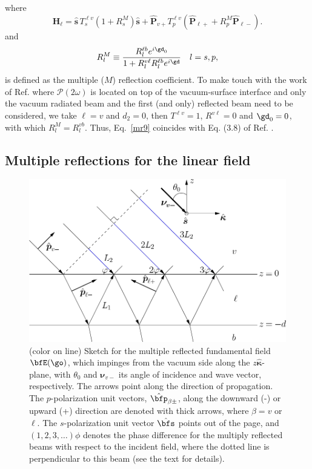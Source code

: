 where
\begin{equation}\label{mr9}
\mathbf{H}_{\ell}
= \hat{\mathbf{s}}\,T_s^{\ell v}
\left(1+
R^M_s
\right)
\hat{\mathbf{s}}
+ \hat{\mathbf{P}}_{v+}T_{p}^{\ell v}
\left(
\hat{\mathbf{P}}_{\ell +} +
R^M_p
 \hat{\mathbf{P}}_{\ell -}
\right). 
\end{equation}
and
\begin{align}\label{m61}
R^M_l\equiv\frac{R^{\ell b}_le^{i\gd_0}}{1+R^{v\ell}_l R^{\ell b}_l e^{i\gd}}
\quad l=s,p
,
\end{align}
is defined as the multiple  ($M$) reflection coefficient.
To make touch with the work of Ref. \cite{mizrahiJOSA88} where
$\boldsymbol{\mathcal{P}}(2\omega)$ is located on top of the
vacuum-surface interface and only the vacuum radiated beam and the
first (and only) reflected beam need to be considered, we take
$\ell=v$ and $d_2=0$, then 
$T^{\ell v}=1$, $R^{v\ell}=0$ and $\gd_0=0$, with which
$R^M_l=R^{vb}_l$. 
Thus, Eq.~\eqref{mr9} coincides with Eq. (3.8) of
Ref. \cite{mizrahiJOSA88}. 

\subsection{Multiple reflections for the linear field}
\begin{figure}[t]
\centering 
\includegraphics[scale=.5]{figures/linear-field}
\caption{(color on line) Sketch for the multiple reflected  fundamental field
$\bfE(\go)$, which impinges from the vacuum side along the
$z\hat{\boldsymbol{\kappa}}$-plane, with $\theta_0$ and $\boldsymbol{\nu}_{v-}$
its angle of incidence and wave vector, respectively. The arrows point along the
direction of propagation. The $p$-polarization unit vectors, $\hat\bfp_{\beta
\pm}$, along the downward (-) or upward (+) direction are denoted with thick
arrows, where $\beta=v$ or $\ell$. The $s$-polarization unit vector $\hat\bfs$
points out of the page, and $(1,2,3,\dots)\phi$ denotes the phase difference for
the multiply reflected beams with respect to the incident field, where the
dotted line is perpendicular to this beam (see the text for
details).\label{linear}}
\end{figure}

